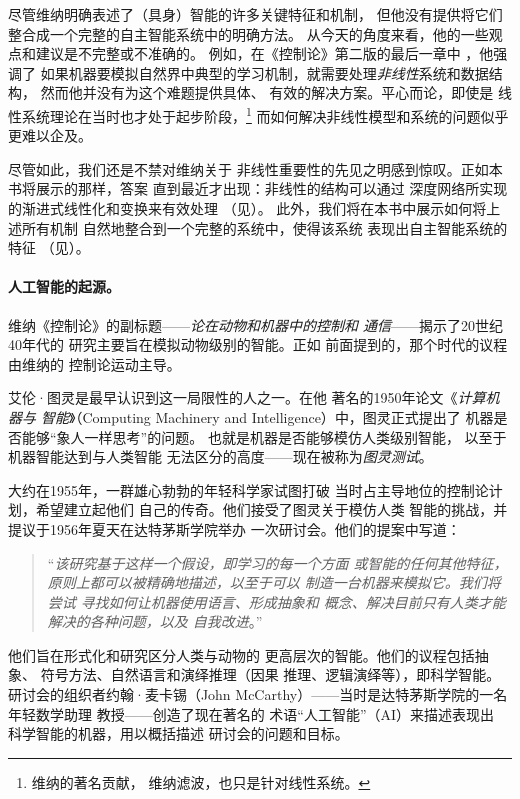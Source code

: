 \documentclass[../../book-main_zh.tex]{subfiles}
\begin{document}
尽管维纳明确表述了（具身）智能的许多关键特征和机制，
但他没有提供将它们整合成一个完整的自主智能系统中的明确方法。
从今天的角度来看，他的一些观点和建议是不完整或不准确的。
例如，在《控制论》第二版的最后一章中
\cite{Wiener-Cybernetics-1961}，他强调了
如果机器要模拟自然界中典型的学习机制，就需要处理\textit{非线性}系统和数据结构，
然而他并没有为这个难题提供具体、
有效的解决方案。平心而论，即使是
线性系统理论在当时也才处于起步阶段，\footnote{维纳的著名贡献，
维纳滤波\cite{Wiener-1942,Wiener-1949}，也只是针对线性系统。} 
而如何解决非线性模型和系统的问题似乎更难以企及。

尽管如此，我们还是不禁对维纳关于
非线性重要性的先见之明感到惊叹。正如本书将展示的那样，答案
直到最近才出现：非线性的结构可以通过
深度网络所实现的渐进式线性化和变换来有效处理
（见）。
此外，我们将在本书中展示如何将上述所有机制
自然地整合到一个完整的系统中，使得该系统
表现出自主智能系统的特征
（见）。

\paragraph{人工智能的起源。}
维纳《控制论》的副标题——\textit{论在动物和机器中的控制和
通信}——揭示了20世纪40年代的
研究主要旨在模拟动物级别的智能。正如
前面提到的，那个时代的议程由维纳的
控制论运动主导。

艾伦·图灵是最早认识到这一局限性的人之一。在他
著名的1950年论文《\textit{计算机器与
智能}》（Computing Machinery and
Intelligence）\cite{Turing-1950}中，图灵正式提出了
机器是否能够“象人一样思考”的问题。
也就是机器是否能够模仿人类级别智能，
以至于机器智能达到与人类智能
无法区分的高度——现在被称为\textit{图灵测试}。

大约在1955年，一群雄心勃勃的年轻科学家试图打破
当时占主导地位的控制论计划，希望建立起他们
自己的传奇。他们接受了图灵关于模仿人类
智能的挑战，并提议于1956年夏天在达特茅斯学院举办
一次研讨会。他们的提案中写道\cite{McCarthy-1955}：
\begin{quote}
    ``\textit{该研究基于这样一个假设，即学习的每一个方面
        或智能的任何其他特征，
        原则上都可以被精确地描述，以至于可以
        制造一台机器来模拟它。我们将尝试
        寻找如何让机器使用语言、形成抽象和
        概念、解决目前只有人类才能解决的各种问题，以及
    自我改进}。''
\end{quote}
他们旨在形式化和研究区分人类与动物的
更高层次的智能。他们的议程包括抽象、
符号方法、自然语言和演绎推理（因果
推理、逻辑演绎等），即科学智能。
研讨会的组织者约翰·麦卡锡（John McCarthy）——当时是达特茅斯学院的一名年轻数学助理
教授——创造了现在著名的
术语“人工智能”（AI）来描述表现出
科学智能的机器，用以概括描述
研讨会的问题和目标。
\end{document}
